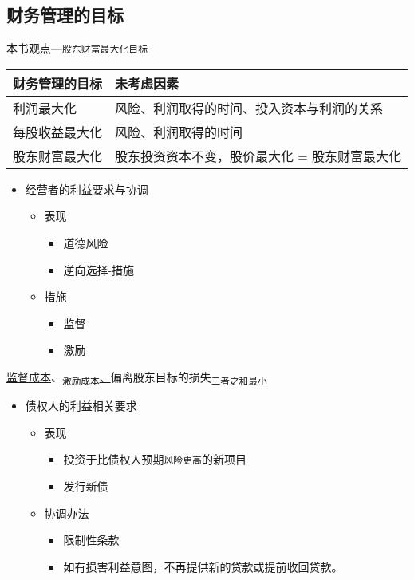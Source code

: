 \documentclass[11pt]{article}
\begin{document}
\subsection{财务管理的目标}
\label{sec:org0fe583c}
本书观点---\texttt{股东财富最大化目标}
\begin{center}
\begin{tabular}{ll}
财务管理的目标 & 未考虑因素\\
\hline
利润最大化 & 风险、利润取得的时间、投入资本与利润的关系\\
每股收益最大化 & 风险、利润取得的时间\\
股东财富最大化 & 股东投资资本不变，股价最大化 = 股东财富最大化\\
\end{tabular}
\end{center}
\begin{itemize}
\item 经营者的利益要求与协调
\begin{itemize}
\item 表现
\begin{itemize}
\item 道德风险
\item 逆向选择-措施
\end{itemize}
\item 措施
\begin{itemize}
\item 监督
\item 激励
\end{itemize}
\end{itemize}
\end{itemize}
\uline{监督成本}、\textsubscript{激励成本}\uline{、}偏离股东目标的损失\textsubscript{三者之和最小}
\begin{itemize}
\item 债权人的利益相关要求
\begin{itemize}
\item 表现
\begin{itemize}
\item 投资于比债权人预期\texttt{风险更高}的新项目
\item 发行新债
\end{itemize}
\item 协调办法
\begin{itemize}
\item 限制性条款
\item 如有损害利益意图，不再提供新的贷款或提前收回贷款。
\end{itemize}
\end{itemize}
\end{itemize}
\end{document}
